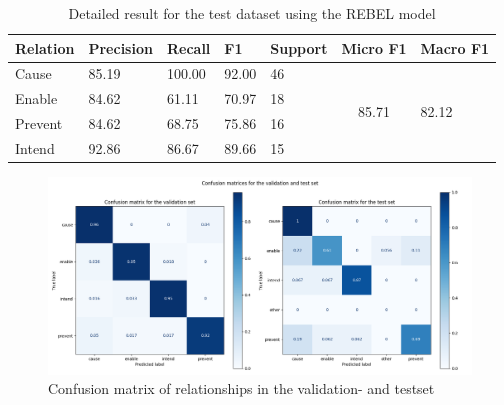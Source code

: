\documentclass[
hf, %
]{ceurart}
\begin{document}
\begin{table}[!h]
\centering
\begin{tabular}{|l|l|l|l|l|c|l|}
\hline
\textbf{Relation} & \textbf{Precision} & \textbf{Recall} & \textbf{F1} & \textbf{Support} & \multicolumn{1}{l|}{\textbf{Micro F1}} & \textbf{Macro F1}      \\ \hline
Cause             & 85.19              & 100.00          & 92.00       & 46               & \multirow{4}{*}{85.71}                 & \multirow{4}{*}{82.12} \\ \cline{1-5}
Enable            & 84.62              & 61.11           & 70.97       & 18               &                                        &                        \\ \cline{1-5}
Prevent           & 84.62              & 68.75           & 75.86       & 16               &                                        &                        \\ \cline{1-5}
Intend            & 92.86              & 86.67           & 89.66       & 15               &                                        &                        \\ \hline
\end{tabular}
\caption{Detailed result for the test dataset using the REBEL model}
\label{apx:test_result_rebel}
\end{table}

\begin{figure}[!h]
    \centering
    \includegraphics[width=1.2\textwidth]{Images/Confusion_matrix.png}
    \caption{Confusion matrix of relationships in the validation- and testset}
    \label{fig:confusion_matrix}
\end{figure}
\end{document}

